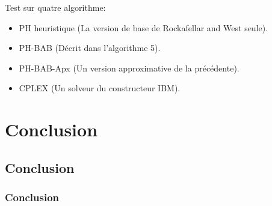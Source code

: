 \documentclass[10pt]{beamer}
\begin{document}
    \begin{frame}
        Test sur quatre algorithme:\\
        \begin{itemize}
            \item PH heuristique (La version de base de Rockafellar and West seule).
            \item PH-BAB (Décrit dans l'algorithme 5).
            \item PH-BAB-Apx (Un version approximative de la précédente).
            \item CPLEX (Un solveur du constructeur IBM).
        \end{itemize}
    \end{frame}
    
    \begin{frame}

    \end{frame}
    
    \section{Conclusion}
    \subsection{Conclusion}
    \begin{frame}
        \frametitle{Conclusion}
        
    \end{frame}
    
    \iffalse
    \fi
    
\end{document}
